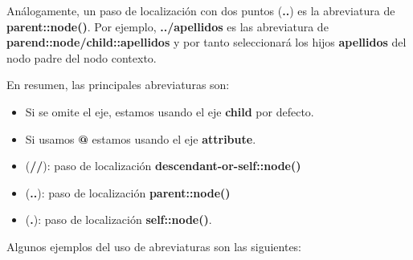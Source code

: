 Análogamente, un paso de localización con dos puntos (\textbf{..}) es la abreviatura de \textbf{parent::node()}. Por ejemplo, \textbf{../apellidos} es las abreviatura de \textbf{parend::node/child::apellidos} y por tanto seleccionará los hijos \textbf{apellidos} del nodo padre del nodo contexto.

En resumen, las principales abreviaturas son:

\begin{itemize}
    \item Si se omite el eje, estamos usando el eje \textbf{child} por defecto.
    \item Si usamos \textbf{@} estamos usando el eje \textbf{attribute}.
    \item (\textbf{//}): paso de localización \textbf{descendant-or-self::node()}
    \item (\textbf{..}): paso de localización \textbf{parent::node()}
    \item (\textbf{.}): paso de localización \textbf{self::node()}.
\end{itemize}

Algunos ejemplos del uso de abreviaturas son las siguientes:

